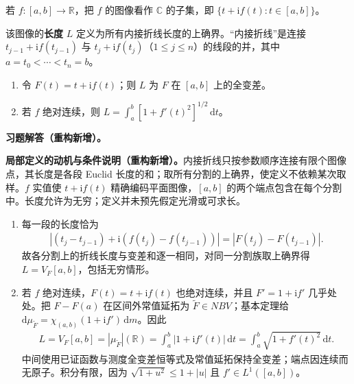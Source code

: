 \documentclass[../../main.tex]{subfiles}%
\begin{document}
\begin{exercise}\label{exercise:ch03-graph-length}
若 $f:[a,b]\to\mathbb R$，把 $f$ 的图像看作 $\mathbb C$ 的子集，即 $\{t+\mathrm if(t):t\in[a,b]\}$。
\begin{definition*}[图像的长度与内接折线]
该图像的\textbf{长度} $L$ 定义为所有内接折线长度的上确界。“内接折线”是连接 $t_{j-1}+\mathrm if(t_{j-1})$ 与 $t_j+\mathrm if(t_j)$（$1\le j\le n$）的线段的并，其中 $a=t_0<\cdots<t_n=b$。
\end{definition*}
\begin{enumerate}
\item\label{item:ch03-graph-length-variation} 令 $F(t)=t+\mathrm if(t)$；则 $L$ 为 $F$ 在 $[a,b]$ 上的全变差。
\item\label{item:ch03-graph-length-integral} 若 $f$ 绝对连续，则 $L=\int_a^b[1+f'(t)^2]^{1/2}\,\mathrm dt$。
\end{enumerate}
\end{exercise}
\begin{solution}
\label{solution:ch03-graph-length}
\textbf{习题解答（重构新增）。}\begin{remark}
\textbf{局部定义的动机与条件说明（重构新增）。}内接折线只按参数顺序连接有限个图像点，其长度是各段 Euclid 长度的和；取所有分割的上确界，使定义不依赖某次取样。$f$ 实值使 $t+\mathrm if(t)$ 精确编码平面图像，$[a,b]$ 的两个端点包含在每个分割中。长度允许为无穷；定义并未预先假定光滑或可求长。
\end{remark}
\begin{enumerate}
\item 每一段的长度恰为
\begin{align*}
\left|(t_j-t_{j-1})+\mathrm i(f(t_j)-f(t_{j-1}))\right|
=|F(t_j)-F(t_{j-1})|.
\end{align*}
故各分割上的折线长度与变差和逐一相同，对同一分割族取上确界得 $L=V_F[a,b]$，包括无穷情形。
\item 若 $f$ 绝对连续，$F(t)=t+\mathrm if(t)$ 也绝对连续，并且 $F'=1+\mathrm if'$ 几乎处处。把 $F-F(a)$ 在区间外常值延拓为 $\widetilde F\in NBV$；基本定理给 $\mathrm d\mu_{\widetilde F}=\chi_{(a,b)}(1+\mathrm if')\,\mathrm dm$。因此
\begin{align*}
L=V_F[a,b]=|\mu_{\widetilde F}|(\mathbb R)
=\int_a^b|1+\mathrm if'(t)|\,\mathrm dt
=\int_a^b\sqrt{1+f'(t)^2}\,\mathrm dt.
\end{align*}
中间使用已证函数与测度全变差恒等式及常值延拓保持全变差；端点因连续而无原子。积分有限，因为 $\sqrt{1+u^2}\le1+|u|$ 且 $f'\in L^1([a,b])$。
\end{enumerate}
\end{solution}
\end{document}

